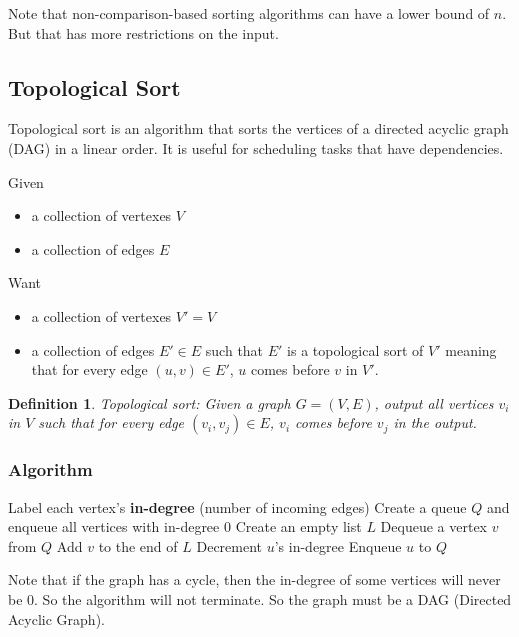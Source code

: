 \documentclass[letterpaper,12pt]{article}
\newtheorem{definition}{Definition}
\begin{document}
Note that non-comparison-based sorting algorithms can have a lower bound of $n$. But that has more restrictions on the input.
\subsection{Topological Sort}
Topological sort is an algorithm that sorts the vertices of a directed acyclic graph (DAG) in a linear order. It is useful for scheduling tasks that have dependencies.

Given \begin{itemize}
    \item a collection of vertexes $V$
    \item a collection of edges $E$
\end{itemize}
Want \begin{itemize}
    \item a collection of vertexes $V'= V$
    \item a collection of edges $E' \in E$ such that $E'$ is a topological sort of $V'$ meaning that for every edge $(u,v) \in E'$, $u$ comes before $v$ in $V'$.
\end{itemize}

\begin{definition}
    Topological sort: Given a graph $G=(V,E)$, output all vertices $v_i$ in $V$ such that for every edge $(v_i, v_j) \in E$, $v_i$ comes before $v_j$ in the output.
\end{definition}

\subsubsection{Algorithm}

\begin{algorithmic}
        \State Label each vertex's \textbf{in-degree} (number of incoming edges)
        \State Create a queue $Q$ and enqueue all vertices with in-degree 0
        \State Create an empty list $L$
            \State Dequeue a vertex $v$ from $Q$
            \State Add $v$ to the end of $L$
                \State Decrement $u$'s in-degree
                    \State Enqueue $u$ to $Q$
                \EndIf
            \EndFor
        \EndWhile
    \EndFunction
\end{algorithmic}
Note that if the graph has a cycle, then the in-degree of some vertices will never be 0. So the algorithm will not terminate. So the graph must be a DAG (Directed Acyclic Graph).
\end{document}
